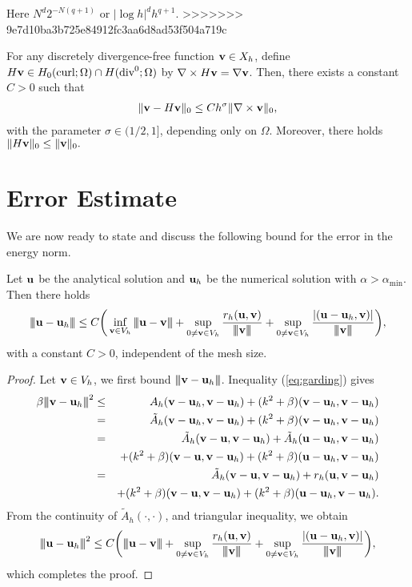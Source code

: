 \documentclass[final,leqno]{siamltex704}
\newcommand{\bv}{{\bf v}}
\def\bu{{\bf u}}
\def\bv{{\bf v}}
\def\3bar{{|\hspace{-.02in}|\hspace{-.02in}|}}
\begin{document}
Here $N^d2^{-N(q+1)}$ or $|\log h|^d h^{q+1}$.
>>>>>>> 9e7d10ba3b725e84912fc3aa6d8ad53f504a719c

\begin{lemma}
For any discretely divergence-free function $\bv\in X_h$, define $H\bv\in H_0(\text{curl};\Omega)\cap H(\text{div}^0;\Omega)$ by $\nabla\times H\bv=\nabla\bv$. Then, there exists a constant $C>0$ such that
\begin{eqnarray}
\|\bv-H\bv\|_0\le Ch^{\sigma}\|\nabla\times\bv\|_0,
\end{eqnarray}
with the parameter $\sigma\in (1/2,1]$, depending only on $\Omega$. Moreover, there holds $\|H\bv\|_0\le \|\bv\|_0.$
\end{lemma}

\section{Error Estimate}
We are now ready to state and discuss the following bound for the error in the energy norm.
\begin{lemma}
Let $\bu$ be the analytical solution and $\bu_h$ be the numerical solution with $\alpha>\alpha_{\min}$. Then there holds
\begin{eqnarray}
\3bar\bu-\bu_h\3bar\le C\bigg(\inf_{\bv\in V_h}\3bar\bu-\bv\3bar+\sup_{0\neq\bv\in V_h}\frac{r_h(\bu,\bv)}{\3bar\bv\3bar}+\sup_{0\neq\bv\in V_h}\frac{|(\bu-\bu_h,\bv)|}{\3bar\bv\3bar}\bigg),
\end{eqnarray}
with a constant $C>0$, independent of the mesh size.
\end{lemma}
\begin{proof}
Let $\bv\in V_h$, we first bound $\3bar\bv-\bu_h\3bar$. Inequality (\ref{eq:garding}) gives
\begin{eqnarray*}
\beta\3bar\bv-\bu_h\3bar^2
%
&\le& A_h(\bv-\bu_h,\bv-\bu_h)+(k^2+\beta)(\bv-\bu_h,\bv-\bu_h)\\
%
&=& \tilde{A}_h(\bv-\bu_h,\bv-\bu_h)+(k^2+\beta)(\bv-\bu_h,\bv-\bu_h)\\
%
&=& \tilde{A}_h(\bv-\bu,\bv-\bu_h)+\tilde{A}_h(\bu-\bu_h,\bv-\bu_h)\\
&&+(k^2+\beta)(\bv-\bu,\bv-\bu_h)+(k^2+\beta)(\bu-\bu_h,\bv-\bu_h)\\
%
&=& \tilde{A}_h(\bv-\bu,\bv-\bu_h)+r_h(\bu,\bv-\bu_h)\\
&&+(k^2+\beta)(\bv-\bu,\bv-\bu_h)+(k^2+\beta)(\bu-\bu_h,\bv-\bu_h).
\end{eqnarray*}
From the continuity of $\tilde{A}_h(\cdot,\cdot)$, and triangular inequality, we obtain
\begin{eqnarray*}
\3bar\bu-\bu_h\3bar^2
%
\le C\bigg(\3bar\bu-\bv\3bar+\sup_{0\neq\bv\in V_h}\frac{r_h(\bu,\bv)}{\3bar\bv\3bar}
+\sup_{0\neq\bv\in V_h}\frac{|(\bu-\bu_h,\bv)|}{\3bar\bv\3bar}
\bigg),
\end{eqnarray*}
which completes the proof.
\end{proof}
\end{document}
